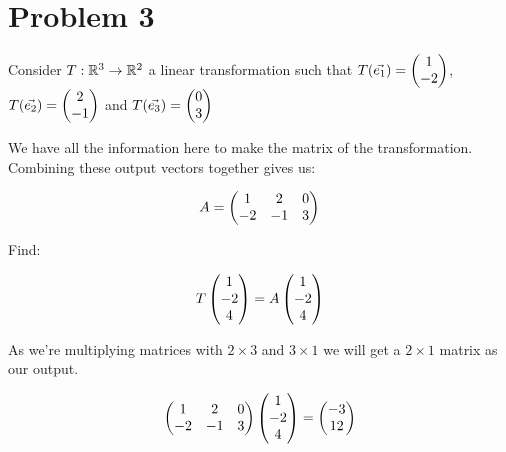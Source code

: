 \section*{Problem 3}

Consider $T: \R^3 \to \R^2$ a linear transformation such that $T(\vec{e_1}) = \genericmat{p}{1\\-2}$, $T(\vec{e_2}) = \genericmat{p}{2\\-1}$ and $T(\vec{e_3}) = \genericmat{p}{0\\3}$

We have all the information here to make the matrix of the transformation. Combining these output vectors together gives us:

\[A = \genpmat{1&2&0\\-2&-1&3}\]

Find:

\[T \genpmat{1\\-2\\4} = A \genpmat{1\\-2\\4}\]

As we're multiplying matrices with $2 \times 3$ and $3 \times 1$ we will get a $2 \times 1$ matrix as our output. 

\[
	\genpmat{1&2&0\\-2&-1&3}
	\genpmat{1\\-2\\4}
	=
	\genpmat{-3\\12}
\]

